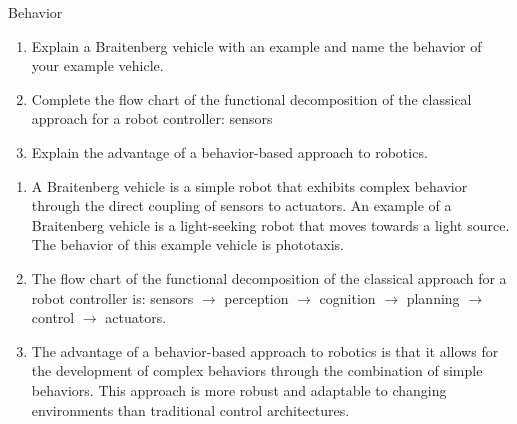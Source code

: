 \documentclass{article}
\begin{document}
\begin{exercise}{Behavior}
  \begin{enumerate}
    \item Explain a Braitenberg vehicle with an example and name the behavior of your example vehicle.
    \item Complete the flow chart of the functional decomposition of the classical approach for a robot controller: sensors
    \item Explain the advantage of a behavior-based approach to robotics.
  \end{enumerate}

  \begin{solution}
    \begin{enumerate}
      \item A Braitenberg vehicle is a simple robot that exhibits complex behavior through the direct coupling of sensors to actuators. An example of a Braitenberg vehicle is a light-seeking robot that moves towards a light source. The behavior of this example vehicle is phototaxis.
      \item The flow chart of the functional decomposition of the classical approach for a robot controller is: sensors $\rightarrow$ perception $\rightarrow$ cognition $\rightarrow$ planning $\rightarrow$ control $\rightarrow$ actuators.
      \item The advantage of a behavior-based approach to robotics is that it allows for the development of complex behaviors through the combination of simple behaviors. This approach is more robust and adaptable to changing environments than traditional control architectures.
    \end{enumerate}
  \end{solution}
\end{exercise}
\end{document}
